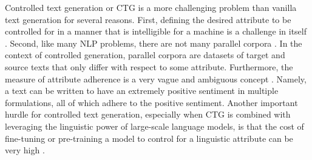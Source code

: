 Controlled text generation or CTG is a more challenging problem than vanilla text generation for several reasons. First, defining the desired attribute to be controlled for in a manner that is intelligible for a machine is a challenge in itself \citep{zheng2019personalized}. Second, like many NLP problems, there are not many parallel corpora \citep{dai2019style}. In the context of controlled generation, parallel corpora are datasets of target and source texts that only differ with respect to some attribute. Furthermore, the measure of attribute adherence is a very vague and ambiguous concept \citep{dathathri2019plug, dai2019style}. Namely, a text can be written to have an extremely positive sentiment in multiple formulations, all of which adhere to the positive sentiment. Another important hurdle for controlled text generation, especially when CTG is combined with leveraging the linguistic power of large-scale language models, is that the cost of fine-tuning or pre-training a model to control for a linguistic attribute can be very high \citep{dathathri2019plug, madotto-etal-2020-plug}. 


